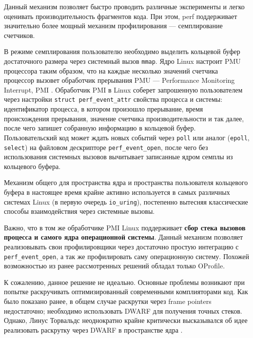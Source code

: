 Данный механизм позволяет быстро проводить различные эксперименты и легко оценивать производительность фрагментов кода.
При этом, perf поддерживает значительно более мощный механизм профилирования --- семплирование счетчиков.

В режиме семплирования пользователю необходимо выделить кольцевой буфер достаточного размера через системный вызов \verb!mmap!.
Ядро Linux настроит PMU процессора таким образом, что на каждые несколько значений счетчика процессор вызовет обработчик прерывания
PMU --- Performance Monitoring Interrupt, PMI \cite{linux:pmi}.
Обработчик PMI в Linux соберет запрошенную пользователем через настройки \verb!struct perf_event_attr! свойства процесса и системы:
идентификатор процесса, в котором произошло прерывание, время происхождения прерывания, значение счетчика производительности и так далее,
после чего запишет собранную информацию в кольцевой буфер. Пользовательский код может ждать новых событий через \verb!poll! 
или аналог (\verb!epoll!, \verb!select!) на файловом дескрипторе \verb!perf_event_open!, после чего без использования системных
вызовов вычитывает записанные ядром семплы из кольцевого буфера.

Механизм общего для пространства ядра и пространства пользователя кольцевого буфера в настоящее время крайне активно используется
в самых различных системах Linux (в первую очередь \lstinline!io_uring!),
постепенно вытесняя классические способы взаимодействия через системные вызовы.

Важно, что в том же обработчике PMI Linux поддерживает \textbf{сбор стека вызовов процесса и самого ядра операционной системы}.
Данный механизм позволяет реализовывать свои профилировщики через достаточно простую интеграцию с \verb!perf_event_open!,
а так же профилировать саму операционную систему. Похожей возможностью из ранее рассмотренных решений обладал только OProfile.

К сожалению, данное решение не идеально.
Основные проблемы возникают при попытке раскручивать оптимизированный современными комплияторами код.
Как было показано ранее, в общем случае раскрутки через frame pointers недостаточно;
необходимо использовать DWARF для получения точных стеков.
Однако, Линус Торвальдс неоднократно крайне критически высказывался об идее реализовать
раскрутку через DWARF в пространстве ядра \cite{dwarf:linus}.

